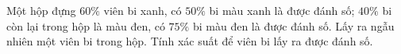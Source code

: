 \begin{ex}
Một hộp đựng $60\%$ viên bi xanh, có $50\%$ bi màu xanh là được đánh số; $40\%$ bi còn lại trong hộp là màu đen, có $75\%$ bi màu đen là được đánh số. Lấy ra ngẫu nhiên một viên bi trong hộp. Tính xác suất để viên bi lấy ra được đánh số.
\end{ex}
